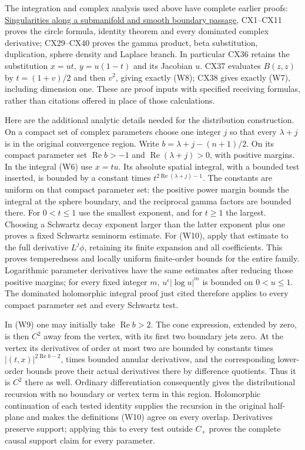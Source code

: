\documentclass[
  11pt,
]{article}
\begin{document}
The integration and complex analysis used above have complete earlier
proofs: \href{conormal-transmission.pdf}{Singularities along a
submanifold and smooth boundary passage}, CX1--CX11 proves the circle
formula, identity theorem and every dominated complex derivative;
CX29--CX40 proves the gamma product, beta substitution, duplication,
sphere density and Laplace branch. In particular CX36 retains the
substitution \(x=ut,\ y=u(1-t)\) and its Jacobian \(u\). CX37 evaluates
\(B(z,z)\) by \(t=(1+v)/2\) and then \(v^2\), giving exactly (W8); CX38
gives exactly (W7), including dimension one. These are proof inputs with
specified receiving formulas, rather than citations offered in place of
those calculations.

Here are the additional analytic details needed for the distribution
construction. On a compact set of complex parameters choose one integer
\(j\) so that every \(\lambda+j\) is in the original convergence region.
Write \(b=\lambda+j-(n+1)/2\). On its compact parameter set
\(\operatorname{Re}b>-1\) and \(\operatorname{Re}(\lambda+j)>0\), with
positive margins. In the integral (W6) use \(x=tu\). Its absolute
spatial integral, with a bounded test inserted, is bounded by a constant
times \(t^{2\operatorname{Re}(\lambda+j)-1}\). The constants are uniform
on that compact parameter set: the positive power margin bounds the
integral at the sphere boundary, and the reciprocal gamma factors are
bounded there. For \(0<t\leq1\) use the smallest exponent, and for
\(t\geq1\) the largest. Choosing a Schwartz decay exponent larger than
the latter exponent plus one proves a fixed Schwartz seminorm estimate.
For (W10), apply that estimate to the full derivative \(L^j\phi\),
retaining its finite expansion and all coefficients. This proves
temperedness and locally uniform finite-order bounds for the entire
family. Logarithmic parameter derivatives have the same estimates after
reducing those positive margins; for every fixed integer \(m\),
\(u^\epsilon|\log u|^m\) is bounded on \(0<u\leq1\). The dominated
holomorphic integral proof just cited therefore applies to every compact
parameter set and every Schwartz test.

In (W9) one may initially take \(\operatorname{Re}b>2\). The cone
expression, extended by zero, is then \(C^2\) away from the vertex, with
its first two boundary jets zero. At the vertex its derivatives of order
at most two are bounded by constants times
\(|(t,x)|^{2\operatorname{Re}b-2}\), times bounded annular derivatives,
and the corresponding lower-order bounds prove their actual derivatives
there by difference quotients. Thus it is \(C^2\) there as well.
Ordinary differentiation consequently gives the distributional recursion
with no boundary or vertex term in this region. Holomorphic continuation
of each tested identity supplies the recursion in the original
half-plane and makes the definitions (W10) agree on every overlap.
Derivatives preserve support; applying this to every test outside
\(C_+\) proves the complete causal support claim for every parameter.
\end{document}
